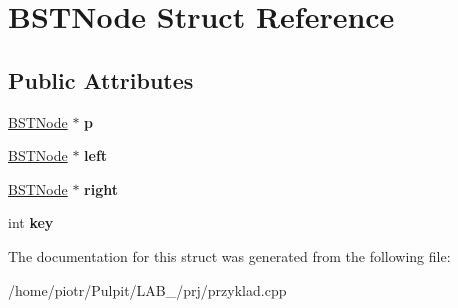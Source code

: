 \hypertarget{struct_b_s_t_node}{\section{\-B\-S\-T\-Node \-Struct \-Reference}
\label{struct_b_s_t_node}
}
\subsection*{\-Public \-Attributes}
\begin{DoxyCompactItemize}
\item 
\hypertarget{struct_b_s_t_node_a4369c90465922975673565fec0ccbe9e}{\hyperlink{struct_b_s_t_node}{\-B\-S\-T\-Node} $\ast$ {\bfseries p}}\label{struct_b_s_t_node_a4369c90465922975673565fec0ccbe9e}

\item 
\hypertarget{struct_b_s_t_node_af75e5eeaca9708cab57505af29ac02e9}{\hyperlink{struct_b_s_t_node}{\-B\-S\-T\-Node} $\ast$ {\bfseries left}}\label{struct_b_s_t_node_af75e5eeaca9708cab57505af29ac02e9}

\item 
\hypertarget{struct_b_s_t_node_a445bed0d2753704cfc1490ca6d5811a1}{\hyperlink{struct_b_s_t_node}{\-B\-S\-T\-Node} $\ast$ {\bfseries right}}\label{struct_b_s_t_node_a445bed0d2753704cfc1490ca6d5811a1}

\item 
\hypertarget{struct_b_s_t_node_af5f574b25c304cea0c59c31afbd0dfba}{int {\bfseries key}}\label{struct_b_s_t_node_af5f574b25c304cea0c59c31afbd0dfba}

\end{DoxyCompactItemize}


\-The documentation for this struct was generated from the following file\-:\begin{DoxyCompactItemize}
\item 
/home/piotr/\-Pulpit/\-L\-A\-B\-\_/prj/przyklad.\-cpp\end{DoxyCompactItemize}
